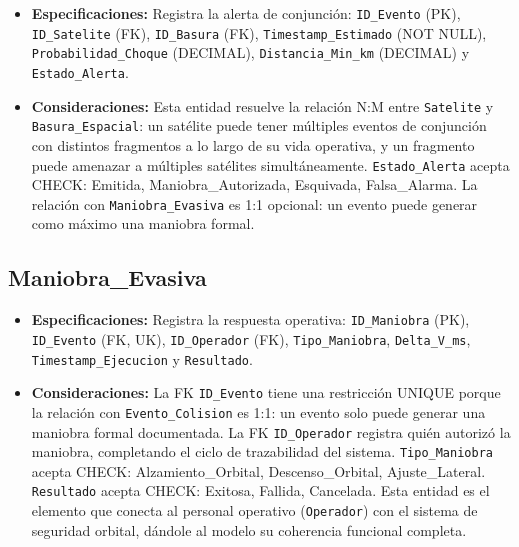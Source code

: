\begin{itemize}
    \item \textbf{Especificaciones:} Registra la alerta de conjunción: \texttt{ID\_Evento} (PK), \texttt{ID\_Satelite} (FK), \texttt{ID\_Basura} (FK), \texttt{Timestamp\_Estimado} (NOT NULL), \texttt{Probabilidad\_Choque} (DECIMAL), \texttt{Distancia\_Min\_km} (DECIMAL) y \texttt{Estado\_Alerta}.
    \item \textbf{Consideraciones:} Esta entidad resuelve la relación N:M entre \texttt{Satelite} y \texttt{Basura\_Espacial}: un satélite puede tener múltiples eventos de conjunción con distintos fragmentos a lo largo de su vida operativa, y un fragmento puede amenazar a múltiples satélites simultáneamente. \texttt{Estado\_Alerta} acepta CHECK: Emitida, Maniobra\_Autorizada, Esquivada, Falsa\_Alarma. La relación con \texttt{Maniobra\_Evasiva} es 1:1 opcional: un evento puede generar como máximo una maniobra formal.
\end{itemize}

\subsection{Maniobra\_Evasiva}

\begin{itemize}
    \item \textbf{Especificaciones:} Registra la respuesta operativa: \texttt{ID\_Maniobra} (PK), \texttt{ID\_Evento} (FK, UK), \texttt{ID\_Operador} (FK), \texttt{Tipo\_Maniobra}, \texttt{Delta\_V\_ms}, \texttt{Timestamp\_Ejecucion} y \texttt{Resultado}.
    \item \textbf{Consideraciones:} La FK \texttt{ID\_Evento} tiene una restricción UNIQUE porque la relación con \texttt{Evento\_Colision} es 1:1: un evento solo puede generar una maniobra formal documentada. La FK \texttt{ID\_Operador} registra quién autorizó la maniobra, completando el ciclo de trazabilidad del sistema. \texttt{Tipo\_Maniobra} acepta CHECK: Alzamiento\_Orbital, Descenso\_Orbital, Ajuste\_Lateral. \texttt{Resultado} acepta CHECK: Exitosa, Fallida, Cancelada. Esta entidad es el elemento que conecta al personal operativo (\texttt{Operador}) con el sistema de seguridad orbital, dándole al modelo su coherencia funcional completa.
\end{itemize}
